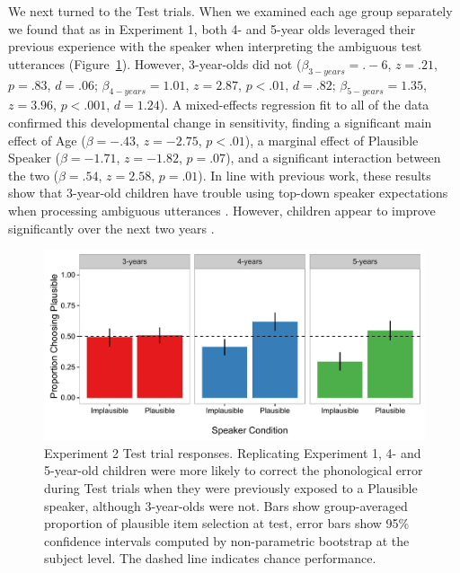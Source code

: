 \documentclass[man,floatsintext]{apa6}
\begin{document}
We next turned to the Test trials. When we examined each age group separately we found that as in Experiment 1, both 4- and 5-year olds leveraged their previous experience with the speaker when interpreting the ambiguous test utterances (Figure~\ref{fig:exp2_results}). However, 3-year-olds did not ($\beta_{3-years} = .-6$, $z = .21$, $p  = .83$, $d = .06$; $\beta_{4-years} = 1.01$, $z = 2.87$, $p < .01$, $d = .82$; $\beta_{5-years} = 1.35$, $z = 3.96$, $p < .001$, $d = 1.24$). A mixed-effects regression fit to all of the data confirmed this developmental change in sensitivity, finding a significant main effect of Age ($\beta = -.43$, $z = -2.75$, $p < .01$), a marginal effect of Plausible Speaker ($\beta = -1.71$, $z = -1.82$, $p = .07$), and a significant interaction between the two ($\beta = .54$, $z = 2.58$, $p = .01$). In line with previous work, these results show that 3-year-old children have trouble using top-down speaker expectations when processing ambiguous utterances \cite{kidd2005}. However, children appear to improve significantly over the next two years \cite{rabagliati2013}.

\begin{figure}[t]
     \centering
     \includegraphics[width=.95\textwidth]{figures/exp2_results.pdf}
    \caption{Experiment 2 Test trial responses. Replicating Experiment 1, 4- and 5-year-old children were more likely to correct the phonological error during Test trials when they were previously exposed to a Plausible speaker, although 3-year-olds were not. Bars show group-averaged proportion of plausible item selection at test, error bars show 95\% confidence intervals computed by non-parametric bootstrap at the subject level. The dashed line indicates chance performance.}%
   \label{fig:exp2_results}
\end{figure}
\end{document}
